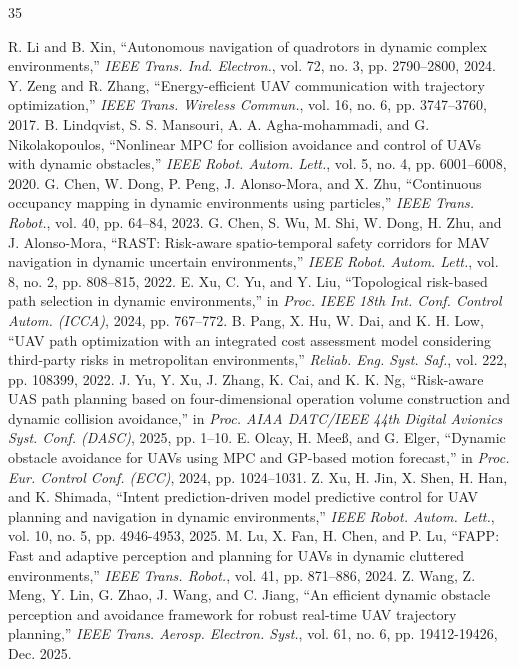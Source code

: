 \documentclass[lettersize,journal]{IEEEtran}
\begin{document}
\begin{thebibliography}{35}
	
	
	 R. Li and B. Xin, ``Autonomous navigation of quadrotors in dynamic complex environments,'' \textit{IEEE Trans. Ind. Electron.}, vol. 72, no. 3, pp. 2790--2800, 2024.
	 Y. Zeng and R. Zhang, ``Energy-efficient UAV communication with trajectory optimization,'' \textit{IEEE Trans. Wireless Commun.}, vol. 16, no. 6, pp. 3747--3760, 2017.
	 B. Lindqvist, S. S. Mansouri, A. A. Agha-mohammadi, and G. Nikolakopoulos, ``Nonlinear MPC for collision avoidance and control of UAVs with dynamic obstacles,'' \textit{IEEE Robot. Autom. Lett.}, vol. 5, no. 4, pp. 6001--6008, 2020.
	 G. Chen, W. Dong, P. Peng, J. Alonso-Mora, and X. Zhu, ``Continuous occupancy mapping in dynamic environments using particles,'' \textit{IEEE Trans. Robot.}, vol. 40, pp. 64--84, 2023.
	 G. Chen, S. Wu, M. Shi, W. Dong, H. Zhu, and J. Alonso-Mora, ``RAST: Risk-aware spatio-temporal safety corridors for MAV navigation in dynamic uncertain environments,'' \textit{IEEE Robot. Autom. Lett.}, vol. 8, no. 2, pp. 808--815, 2022.
	 E. Xu, C. Yu, and Y. Liu, ``Topological risk-based path selection in dynamic environments,'' in \textit{Proc. IEEE 18th Int. Conf. Control Autom. (ICCA)}, 2024, pp. 767--772.
	 B. Pang, X. Hu, W. Dai, and K. H. Low, ``UAV path optimization with an integrated cost assessment model considering third-party risks in metropolitan environments,'' \textit{Reliab. Eng. Syst. Saf.}, vol. 222, pp. 108399, 2022.
	 J. Yu, Y. Xu, J. Zhang, K. Cai, and K. K. Ng, ``Risk-aware UAS path planning based on four-dimensional operation volume construction and dynamic collision avoidance,'' in \textit{Proc. AIAA DATC/IEEE 44th Digital Avionics Syst. Conf. (DASC)}, 2025, pp. 1--10.
	 E. Olcay, H. Meeß, and G. Elger, ``Dynamic obstacle avoidance for UAVs using MPC and GP-based motion forecast,'' in \textit{Proc. Eur. Control Conf. (ECC)}, 2024, pp. 1024--1031.
	 Z. Xu, H. Jin, X. Shen, H. Han, and K. Shimada, ``Intent prediction-driven model predictive control for UAV planning and navigation in dynamic environments,'' \textit{IEEE Robot. Autom. Lett.}, vol. 10, no. 5, pp. 4946-4953, 2025.
	 M. Lu, X. Fan, H. Chen, and P. Lu, ``FAPP: Fast and adaptive perception and planning for UAVs in dynamic cluttered environments,'' \textit{IEEE Trans. Robot.}, vol. 41, pp. 871--886, 2024.
	 Z. Wang, Z. Meng, Y. Lin, G. Zhao, J. Wang, and C. Jiang, ``An efficient dynamic obstacle perception and avoidance framework for robust real-time UAV trajectory planning,'' \textit{IEEE Trans. Aerosp. Electron. Syst.}, vol. 61, no. 6, pp. 19412-19426, Dec. 2025.

\end{thebibliography}
\end{document}
